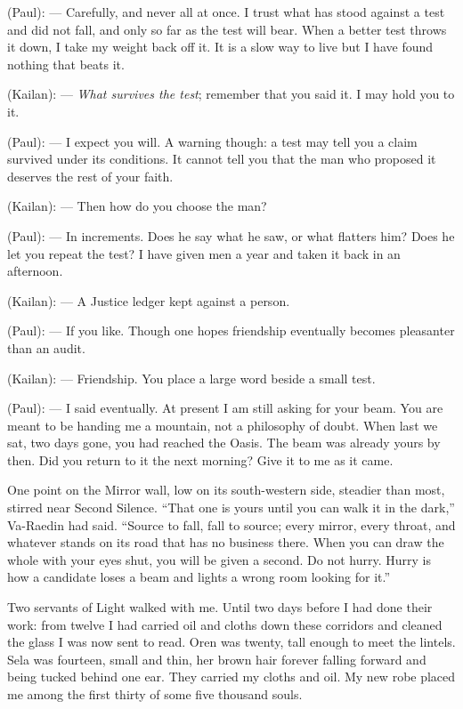 \begin{room}
(Paul): --- Carefully, and never all at once. I trust what has stood against a test and did not fall, and only so far as the test will bear. When a better test throws it down, I take my weight back off it. It is a slow way to live but I have found nothing that beats it.

(Kailan): --- \textit{What survives the test}; remember that you said it. I may hold you to it.

(Paul): --- I expect you will. A warning though: a test may tell you a claim survived under its conditions. It cannot tell you that the man who proposed it deserves the rest of your faith.

(Kailan): --- Then how do you choose the man?

(Paul): --- In increments. Does he say what he saw, or what flatters him? Does he let you repeat the test? I have given men a year and taken it back in an afternoon.

(Kailan): --- A Justice ledger kept against a person.

(Paul): --- If you like. Though one hopes friendship eventually becomes pleasanter than an audit.

(Kailan): --- Friendship. You place a large word beside a small test.

(Paul): --- I said eventually. At present I am still asking for your beam. You are meant to be handing me a mountain, not a philosophy of doubt. When last we sat, two days gone, you had reached the Oasis. The beam was already yours by then. Did you return to it the next morning? Give it to me as it came.

\end{room}

One point on the Mirror wall, low on its south-western side, steadier than most, stirred near Second Silence. ``That one is yours until you can walk it in the dark,'' Va-Raedin had said. ``Source to fall, fall to source; every mirror, every throat, and whatever stands on its road that has no business there. When you can draw the whole with your eyes shut, you will be given a second. Do not hurry. Hurry is how a candidate loses a beam and lights a wrong room looking for it.''\par

Two servants of Light walked with me. Until two days before I had done their work: from twelve I had carried oil and cloths down these corridors and cleaned the glass I was now sent to read. Oren was twenty, tall enough to meet the lintels. Sela was fourteen, small and thin, her brown hair forever falling forward and being tucked behind one ear. They carried my cloths and oil. My new robe placed me among the first thirty of some five thousand souls.\par

